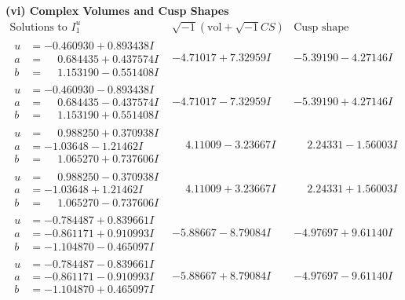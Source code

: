 \documentclass[1p]{elsarticle_modified}
\theoremstyle{definition}
\newcommand{\I}{\sqrt{-1}}
\begin{document}
\newpage\flushleft \textbf{(vi) Complex Volumes and Cusp Shapes}
$$\begin{array}{c|c|c}  
\text{Solutions to }I^u_{1}& \I (\text{vol} + \sqrt{-1}CS) & \text{Cusp shape}\\
 \hline 
\begin{aligned}
u &= -0.460930 + 0.893438 I \\
a &= \phantom{-}0.684435 + 0.437574 I \\
b &= \phantom{-}1.153190 - 0.551408 I\end{aligned}
 & -4.71017 + 7.32959 I & -5.39190 - 4.27146 I \\ \hline\begin{aligned}
u &= -0.460930 - 0.893438 I \\
a &= \phantom{-}0.684435 - 0.437574 I \\
b &= \phantom{-}1.153190 + 0.551408 I\end{aligned}
 & -4.71017 - 7.32959 I & -5.39190 + 4.27146 I \\ \hline\begin{aligned}
u &= \phantom{-}0.988250 + 0.370938 I \\
a &= -1.03648 - 1.21462 I \\
b &= \phantom{-}1.065270 + 0.737606 I\end{aligned}
 & \phantom{-}4.11009 - 3.23667 I & \phantom{-}2.24331 - 1.56003 I \\ \hline\begin{aligned}
u &= \phantom{-}0.988250 - 0.370938 I \\
a &= -1.03648 + 1.21462 I \\
b &= \phantom{-}1.065270 - 0.737606 I\end{aligned}
 & \phantom{-}4.11009 + 3.23667 I & \phantom{-}2.24331 + 1.56003 I \\ \hline\begin{aligned}
u &= -0.784487 + 0.839661 I \\
a &= -0.861171 + 0.910993 I \\
b &= -1.104870 - 0.465097 I\end{aligned}
 & -5.88667 - 8.79084 I & -4.97697 + 9.61140 I \\ \hline\begin{aligned}
u &= -0.784487 - 0.839661 I \\
a &= -0.861171 - 0.910993 I \\
b &= -1.104870 + 0.465097 I\end{aligned}
 & -5.88667 + 8.79084 I & -4.97697 - 9.61140 I \\ \hline\begin{aligned}

\end{aligned}
\end{array}$$
\end{document}
